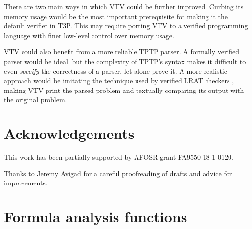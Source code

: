 \documentclass[12pt]{article}
\begin{document}
There are two main ways in which VTV could be further improved. Curbing its 
memory usage would be the most important prerequisite for making it the 
default verifier in T3P. This may require porting VTV to a verified programming
language with finer low-level control over memory usage. 

VTV could also benefit from a more reliable TPTP parser. A formally verified 
parser would be ideal, but the complexity of TPTP's syntax makes it difficult  
to even \textit{specify} the correctness of a parser, let alone prove it. 
A more realistic approach would be imitating the technique used by verified 
LRAT checkers \cite{heule2017efficient}, making VTV print the parsed problem 
and textually comparing its output with the original problem.



\section*{Acknowledgements}  \label{sec:ack}

This work has been partially supported by AFOSR grant FA9550-18-1-0120.

Thanks to Jeremy Avigad for a careful proofreading of drafts and advice for improvements.









\appendix  

\section{Formula analysis functions} \label{apdx:faf}


\end{document}
